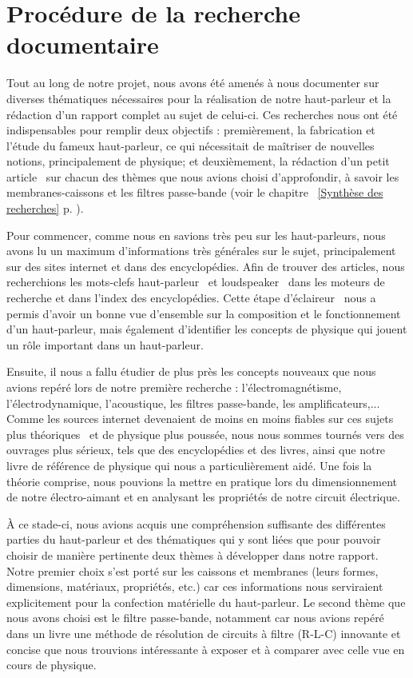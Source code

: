 \section{Procédure de la recherche documentaire} 
\label{sec:app/demarche}

Tout au long de notre projet, nous avons été amenés à nous documenter sur diverses thématiques nécessaires pour la réalisation de notre haut-parleur et la rédaction d'un rapport complet au sujet de celui-ci.
Ces recherches nous ont été indispensables pour remplir deux objectifs : premièrement, la fabrication et l'étude du fameux haut-parleur, ce qui nécessitait de maîtriser de nouvelles notions, principalement de physique; et deuxièmement, la rédaction d'un petit \og article \fg\ sur chacun des thèmes que nous avions choisi d'approfondir, à savoir les membranes-caissons et les filtres passe-bande (voir le chapitre ~\ref{Synthèse des recherches} p. \pageref{Synthèse des recherches}).
\newline

Pour commencer, comme nous en savions très peu sur les haut-parleurs, nous avons lu un maximum d’informations très générales sur le sujet, principalement sur des sites internet et dans des encyclopédies. Afin de trouver des articles, nous recherchions les mots-clefs \og haut-parleur \fg\ et \og loudspeaker \fg\ dans les moteurs de recherche et dans l'index des encyclopédies. 
Cette étape \og d'éclaireur \fg\ nous a permis d'avoir un bonne vue d’ensemble sur la composition et le fonctionnement d’un haut-parleur, mais également d'identifier les concepts de physique qui jouent un rôle important dans un haut-parleur.  

Ensuite, il nous a fallu étudier de plus près les concepts nouveaux que nous avions repéré lors de notre première recherche : l'électromagnétisme, l'électrodynamique, l’acoustique, les filtres passe-bande, les amplificateurs,... Comme les sources internet devenaient de moins en moins fiables sur ces sujets plus \og théoriques \fg\ et de physique plus poussée, nous nous sommes tournés vers des ouvrages plus sérieux, tels que des encyclopédies et des livres, ainsi que notre livre de référence de physique \cite{Pearson} qui nous a particulièrement aidé. Une fois la théorie comprise, nous pouvions la mettre en pratique lors du dimensionnement de notre électro-aimant et en analysant les propriétés de notre circuit électrique. 
\newline

À ce stade-ci, nous avions acquis une compréhension suffisante des différentes parties du haut-parleur et des thématiques qui y sont liées que pour pouvoir choisir de manière pertinente deux thèmes à développer dans notre rapport. Notre premier choix s'est  porté sur les caissons et membranes (leurs formes, dimensions, matériaux, propriétés, etc.) car ces informations nous serviraient explicitement pour la confection matérielle du haut-parleur. Le second thème que nous avons choisi est le filtre passe-bande, notamment car nous avions repéré dans un livre une méthode de résolution de circuits à filtre (R-L-C) innovante et concise que nous trouvions intéressante à exposer et à comparer avec celle vue en cours de physique. 

